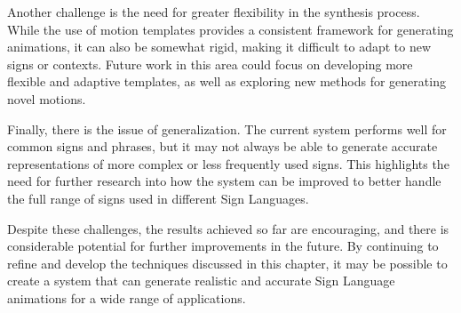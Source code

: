 \documentclass[../../main.tex]{subfiles}
\begin{document}
Another challenge is the need for greater flexibility in the synthesis process. While the use of motion templates provides a consistent framework for generating animations, it can also be somewhat rigid, making it difficult to adapt to new signs or contexts. Future work in this area could focus on developing more flexible and adaptive templates, as well as exploring new methods for generating novel motions.

Finally, there is the issue of generalization. The current system performs well for common signs and phrases, but it may not always be able to generate accurate representations of more complex or less frequently used signs. This highlights the need for further research into how the system can be improved to better handle the full range of signs used in different Sign Languages.

Despite these challenges, the results achieved so far are encouraging, and there is considerable potential for further improvements in the future. By continuing to refine and develop the techniques discussed in this chapter, it may be possible to create a system that can generate realistic and accurate Sign Language animations for a wide range of applications.
\end{document}
